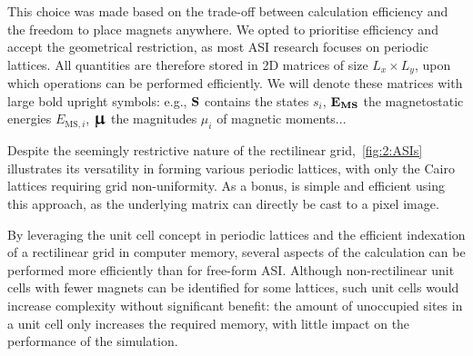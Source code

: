 \vspace{-1em}

This choice was made based on the trade-off between calculation efficiency and the freedom to place magnets anywhere.
We opted to prioritise efficiency and accept the geometrical restriction, as most ASI research focuses on periodic lattices.
All quantities are therefore stored in 2D matrices of size $L_x \times L_y$, upon which operations can be performed efficiently.
We will denote these matrices with large bold upright symbols: e.g., $\boldsymbol{\mathbf{S}}$ contains the states $s_i$, $\boldsymbol{\mathbf{E_\mathrm{MS}}}$ the magnetostatic energies $E_{\mathrm{MS},i}$, $\vc{\bigmu}$ the magnitudes $\mu_i$ of magnetic moments... \par %
Despite the seemingly restrictive nature of the rectilinear grid,~\cref{fig:2:ASIs} illustrates its versatility in forming various periodic lattices, with only the Cairo lattices requiring grid non-uniformity.
As a bonus,  is simple and efficient using this approach, as the underlying matrix can directly be cast to a pixel image. \\\par
By leveraging the unit cell concept in periodic lattices and the efficient indexation of a rectilinear grid in computer memory, several aspects of the calculation can be performed more efficiently than for free-form ASI.
Although non-rectilinear unit cells with fewer magnets can be identified for some lattices, such unit cells would increase complexity without significant benefit: the amount of unoccupied sites in a unit cell only increases the required memory, with little impact on the performance of the simulation.

